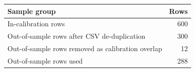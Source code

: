 \begin{tabular}{lr}
\toprule
Sample group & Rows \\
\midrule
In-calibration rows & 600 \\
Out-of-sample rows after CSV de-duplication & 300 \\
Out-of-sample rows removed as calibration overlap & 12 \\
Out-of-sample rows used & 288 \\
\bottomrule
\end{tabular}
